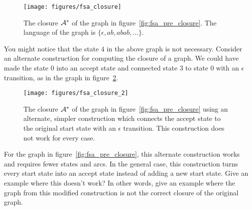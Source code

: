 \begin{figure}
    \centering
    \texttt{[image: figures/fsa\_closure]}
    \caption{The closure $\mathcal{A}^*$ of the graph in
    figure~\ref{fig:fsa_pre_closure}. The language of the graph is $\{\epsilon,
    ab, abab, \ldots\}$.}
    \label{fig:fsa_closure}
\end{figure}

\begin{example}
You might notice that the state $4$ in the above graph is not necessary.
Consider an alternate construction for computing the closure of a graph. We
could have made the state $0$ into an accept state and connected state $3$
to state $0$ with an $\epsilon$ transition, as in the graph in
figure~\ref{fig:fsa_closure_2}.

\begin{figure}
    \centering
    \texttt{[image: figures/fsa\_closure\_2]}
    \caption{The closure $\mathcal{A}^*$ of the graph in
    figure~\ref{fig:fsa_pre_closure} using an alternate, simpler construction
    which connects the accept state to the original start state with an
    $\epsilon$ transition. This construction does not work for every case.}
    \label{fig:fsa_closure_2}
\end{figure}

For the graph in figure~\ref{fig:fsa_pre_closure}, this alternate construction
works and requires fewer states and arcs. In the general case, this
construction turns every start state into an accept state instead of adding
a new start state. Give an example where this doesn't work? In other words,
give an example where the graph from this modified construction is not the
correct closure of the original graph.
\end{example}

